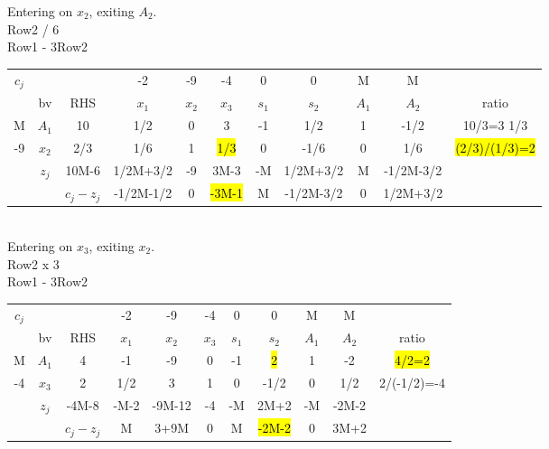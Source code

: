 \documentclass[answers]{exam}
\begin{document}
\noindent
Entering on $x_2$, exiting $A_2$. \\
Row2 / 6 \\
Row1 - 3Row2 \\


\begin{tabular}{ccccccccccc}
	$c_j$                   &                            &                                & -2        & -9    & -4    & 0     & 0        & M    & M       &               \\
	\multicolumn{1}{c|}{}   & \multicolumn{1}{c|}{bv}    & \multicolumn{1}{c|}{RHS}       & $x_1$     & $x_2$ & $x_3$ & $s_1$ & $s_2$    & $A_1$ & $A_2$    & ratio         \\ \cline{1-10}
	\multicolumn{1}{c|}{M} & \multicolumn{1}{c|}{$A_1$} & \multicolumn{1}{c|}{10}        & 1/2       & 0     & 3     & -1    & 1/2      & 1     & -1/2     & 10/3=3 1/3    \\
	\multicolumn{1}{c|}{-9} & \multicolumn{1}{c|}{$x_2$} & \multicolumn{1}{c|}{2/3}       & 1/6       & 1     & \hl{1/3}   & 0     & -1/6     & 0     & 1/6      & \hl{(2/3)/(1/3)=2} \\ \cline{1-10}
	& \multicolumn{1}{c|}{$z_j$} & \multicolumn{1}{c|}{10M-6}      & 1/2M+3/2 & -9    & 3M-3 & -M     & 1/2M+3/2 & M    & -1/2M-3/2 &               \\ \cline{3-10}
	&                            & \multicolumn{1}{c|}{$c_j-z_j$} & -1/2M-1/2  & 0     & \hl{-3M-1}  & M    & -1/2M-3/2 & 0     & 1/2M+3/2 &              
\end{tabular} \\

\noindent
Entering on $x_3$, exiting $x_2$. \\
Row2 x 3 \\
Row1 - 3Row2 \\


\begin{tabular}{ccccccccccc}
	$c_j$                   &                            &                                & -2    & -9    & -4    & 0     & 0     & M    & M    &             \\
	\multicolumn{1}{c|}{}   & \multicolumn{1}{c|}{bv}    & \multicolumn{1}{c|}{RHS}       & $x_1$ & $x_2$ & $x_3$ & $s_1$ & $s_2$ & $A_1$ & $A_2$ & ratio       \\ \cline{1-10}
	\multicolumn{1}{c|}{M} & \multicolumn{1}{c|}{$A_1$} & \multicolumn{1}{c|}{4}         & -1    & -9    & 0     & -1    & \hl{2}     & 1     & -2    & \hl{4/2=2}       \\
	\multicolumn{1}{c|}{-4} & \multicolumn{1}{c|}{$x_3$} & \multicolumn{1}{c|}{2}         & 1/2   & 3     & 1     & 0     & -1/2  & 0     & 1/2   & 2/(-1/2)=-4 \\ \cline{1-10}
	& \multicolumn{1}{c|}{$z_j$} & \multicolumn{1}{c|}{-4M-8}     & -M-2   & -9M-12 & -4  & -M     & 2M+2  & -M    & -2M-2  &             \\ \cline{3-10}
	&                            & \multicolumn{1}{c|}{$c_j-z_j$} & M    & 3+9M  & 0     & M    & \hl{-2M-2}    & 0     & 3M+2  &            
\end{tabular} \\
\end{document}
